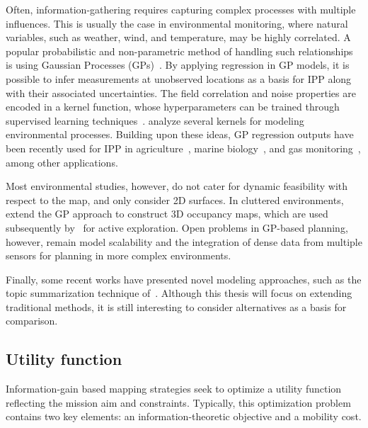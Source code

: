 Often, information-gathering requires capturing complex processes with multiple influences. This 
is usually the case in environmental monitoring, where natural variables, such as weather, 
wind, and temperature, may be highly correlated. A popular probabilistic and non-parametric method of 
handling such relationships is using Gaussian Processes (GPs)~\cite{Rasmussen2006, Hitz2015, Binney2013, 
Krause2011, Singh2009, Singh2010, Vivaldini2016}. By applying regression in GP models, it is possible to 
infer measurements at unobserved locations as a basis for IPP along with their associated uncertainties. The 
field correlation and noise properties are encoded in a kernel function, whose hyperparameters can be trained 
through supervised learning techniques~\cite{Rasmussen2006}. \citet{Singh2010} analyze several kernels 
for modeling environmental processes. Building upon these ideas, GP regression outputs have been recently 
used for IPP in agriculture~\cite{Vivaldini2016}, marine biology~\cite{Hitz2015, 
Hitz2014}, and gas monitoring~\cite{Marchant2014}, among other applications.

Most environmental studies, however, do not cater for dynamic feasibility with respect to the map, and only 
consider 2D surfaces. In cluttered environments,~\citet{OCallaghan2012} extend the GP approach to construct 
3D occupancy maps, which are used subsequently by~\citet{Yang2014} for active exploration. Open problems in 
GP-based planning, however, remain model scalability and the integration of dense data from multiple sensors 
for planning in more complex environments.

Finally, some recent works have presented novel modeling approaches, such as the topic 
summarization technique of~\citet{Girdhar2015}. Although this thesis will focus on extending traditional 
methods, it is still interesting to consider alternatives as a basis for comparison.

\subsection{Utility function}
Information-gain based mapping strategies seek to optimize a utility function reflecting the mission 
aim and constraints. Typically, this optimization problem contains two key elements: an 
information-theoretic objective and a mobility cost.

